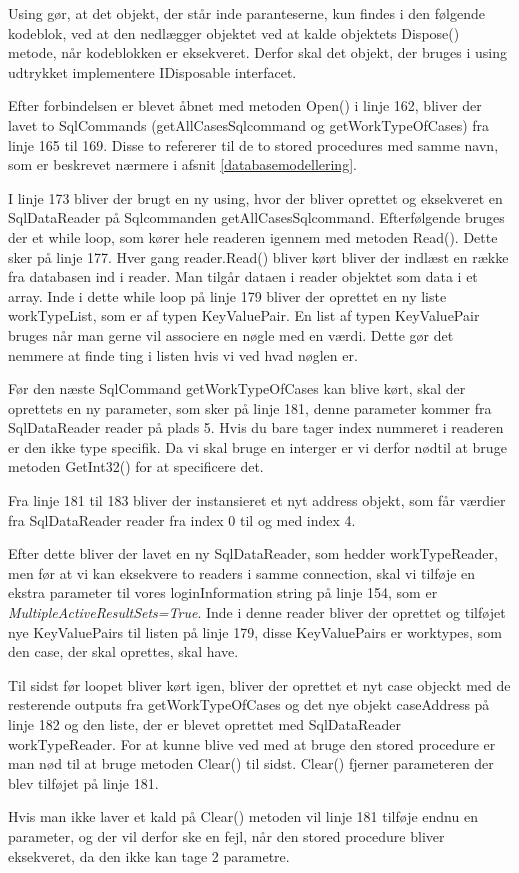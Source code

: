 Using gør, at det objekt, der står inde paranteserne, kun findes i den følgende kodeblok, ved at den nedlægger objektet ved at kalde objektets Dispose() metode, når kodeblokken er eksekveret.
Derfor skal det objekt, der bruges i using udtrykket implementere IDisposable interfacet.\cite{using}

Efter forbindelsen er blevet åbnet med metoden Open() i linje 162, bliver der lavet to SqlCommands (getAllCasesSqlcommand og getWorkTypeOfCases) fra linje 165 til 169.
Disse to refererer til de to stored procedures med samme navn, som er beskrevet nærmere i afsnit \ref{databasemodellering}.

I linje 173 bliver der brugt en ny using, hvor der bliver oprettet og eksekveret en SqlDataReader på Sqlcommanden getAllCasesSqlcommand.
Efterfølgende bruges der et while loop, som kører hele readeren igennem med metoden Read().
Dette sker på linje 177.
Hver gang reader.Read() bliver kørt bliver der indlæst en række fra databasen ind i reader.
Man tilgår dataen i reader objektet som data i et array.
Inde i dette while loop på linje 179 bliver der oprettet en ny liste workTypeList, som er af typen KeyValuePair.
En list af typen KeyValuePair bruges når man gerne vil associere en nøgle med en værdi.
Dette gør det nemmere at finde ting i listen hvis vi ved hvad nøglen er.

Før den næste SqlCommand getWorkTypeOfCases kan blive kørt, skal der oprettets en ny parameter, som sker på linje 181, denne parameter kommer fra SqlDataReader reader på plads 5.
Hvis du bare tager index nummeret i readeren er den ikke type specifik.
Da vi skal bruge en interger er vi derfor nødtil at bruge metoden GetInt32() for at specificere det.\cite{sqlreader}

Fra linje 181 til 183 bliver der instansieret et nyt address objekt, som får værdier fra SqlDataReader reader fra index 0 til og med index 4.

Efter dette bliver der lavet en ny SqlDataReader, som hedder workTypeReader, men før at vi kan eksekvere to readers i samme connection, skal vi tilføje en ekstra parameter til vores loginInformation string på linje 154, som er \textit{MultipleActiveResultSets=True}.
Inde i denne reader bliver der oprettet og tilføjet nye KeyValuePairs til listen på linje 179, disse KeyValuePairs er worktypes, som den case, der skal oprettes, skal have.

Til sidst før loopet bliver kørt igen, bliver der oprettet et nyt case objeckt med de resterende outputs fra getWorkTypeOfCases og det nye objekt caseAddress på linje 182 og den liste, der er blevet oprettet med SqlDataReader workTypeReader.
For at kunne blive ved med at bruge den stored procedure er man nød til at bruge metoden Clear() til sidst.
Clear() fjerner parameteren der blev tilføjet på linje 181.

Hvis man ikke laver et kald på Clear() metoden vil linje 181 tilføje endnu en parameter, og der vil derfor ske en fejl, når den stored procedure bliver eksekveret, da den ikke kan tage 2 parametre.
